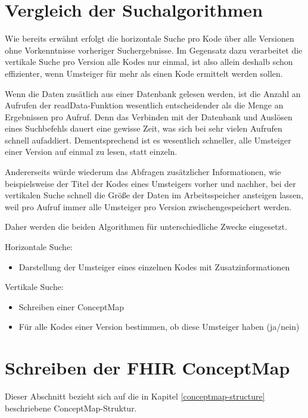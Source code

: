 
\section{Vergleich der Suchalgorithmen}

Wie bereits erwähnt erfolgt die horizontale Suche pro Kode über alle Versionen ohne Vorkenntnisse vorheriger Suchergebnisse. Im Gegensatz dazu verarbeitet die vertikale Suche pro Version alle Kodes nur einmal, ist also allein deshalb schon effizienter, wenn Umsteiger für mehr als einen Kode ermittelt werden sollen. 

Wenn die Daten zusätlich aus einer Datenbank gelesen werden, ist die Anzahl an Aufrufen der readData-Funktion wesentlich entscheidender als die Menge an Ergebnissen pro Aufruf. Denn das Verbinden mit der Datenbank und Auslösen eines Suchbefehls dauert eine gewisse Zeit, was sich bei sehr vielen Aufrufen schnell aufaddiert. Dementsprechend ist es wesentlich schneller, alle Umsteiger einer Version auf einmal zu lesen, statt einzeln. 

Andererseits würde wiederum das Abfragen zusätzlicher Informationen, wie beispielsweise der Titel der Kodes eines Umsteigers vorher und nachher, bei der vertikalen Suche schnell die Größe der Daten im Arbeitsspeicher ansteigen lassen, weil pro Aufruf immer alle Umsteiger pro Version zwischengespeichert werden. 

Daher werden die beiden Algorithmen für unterschiedliche Zwecke eingesetzt.

Horizontale Suche:

\begin{itemize}
\item Darstellung der Umsteiger eines einzelnen Kodes mit Zusatzinformationen
\end{itemize}

Vertikale Suche: 

\begin{itemize}
\item Schreiben einer ConceptMap
\item Für alle Kodes einer Version bestimmen, ob diese Umsteiger haben (ja/nein)
\end{itemize}

\section{Schreiben der FHIR ConceptMap}
\label{write-conceptmap}

Dieser Abschnitt bezieht sich auf die in Kapitel \ref{conceptmap-structure} beschriebene ConceptMap-Struktur. 


